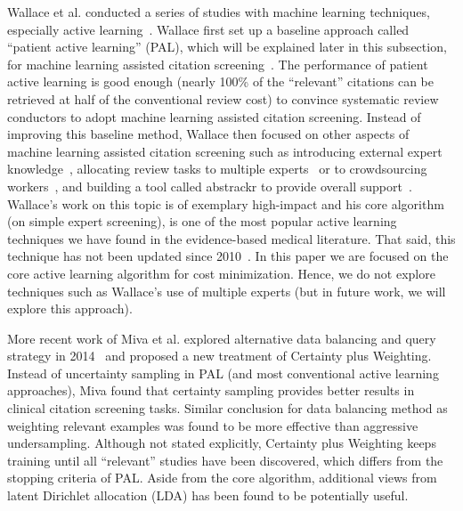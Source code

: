 \documentclass{svjour3}
\theoremstyle{break}
\begin{document}
Wallace et al. conducted a series of studies
with machine learning techniques, especially active
learning~\cite{wallace2010semi,wallace2010active,wallace2011should,wallace2012deploying,wallace2013active,wallace2013modernizing,nguyen2015combining}. Wallace
first set up a baseline approach called ``patient active learning'' (PAL), which will be explained later in this subsection, for machine learning assisted citation screening~\cite{wallace2010semi}. The performance of patient active learning is good enough (nearly 100\% of the ``relevant''
citations can be retrieved at half of the conventional review cost) to convince
systematic review conductors to adopt machine learning assisted citation
screening. Instead of improving this baseline method, Wallace then focused on other aspects of machine learning assisted citation screening such as introducing external expert knowledge~\cite{wallace2010active}, allocating review tasks to multiple experts~\cite{wallace2011should} or to crowdsourcing workers~\cite{nguyen2015combining}, and building a tool called abstrackr to provide overall support~\cite{wallace2012deploying}. Wallace's work on this topic is of exemplary high-impact and his core algorithm   (on simple expert screening),   is one of the most popular active learning techniques we have found in the evidence-based medical literature. That said, this technique has not been updated since 2010~\cite{wallace2010semi}. In this paper we are focused on the core active learning algorithm for cost minimization. Hence, we do not explore techniques such as Wallace's use of multiple experts (but in future work, we will explore this approach).

More recent work of Miva et al. explored alternative data balancing and query strategy in 2014~\cite{miwa2014reducing} and proposed a new treatment of Certainty plus Weighting. Instead of uncertainty sampling in PAL (and most conventional active learning approaches), Miva found that certainty sampling provides better results in clinical citation screening tasks. Similar conclusion for data balancing method as weighting relevant examples was found to be more effective than aggressive undersampling. Although not stated explicitly, Certainty plus Weighting keeps training until all ``relevant'' studies have been discovered, which differs from the stopping criteria of PAL. Aside from the core algorithm, additional views from latent Dirichlet allocation (LDA) has been found to be potentially useful.
\end{document}
